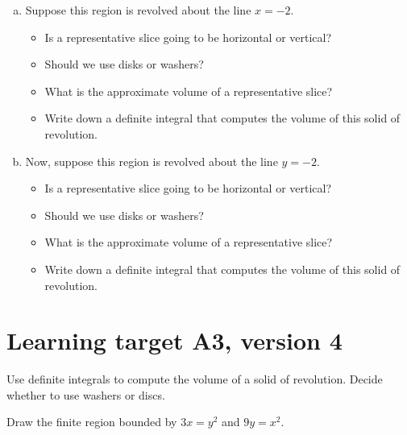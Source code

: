 \begin{enumerate}[(a), leftmargin=20pt]
	\item Suppose this region is revolved about the line $x = -2$.
	\begin{itemize}
		\item Is a representative slice going to be horizontal or vertical?
		\item Should we use disks or washers?
		\item What is the approximate volume of a representative slice?
		\item Write down a definite integral that computes the volume of this solid of revolution.
	\end{itemize}

	\vfill

	\item Now, suppose this region is revolved about the line $y=-2$.
	\begin{itemize}
		\item Is a representative slice going to be horizontal or vertical?
		\item Should we use disks or washers?
		\item What is the approximate volume of a representative slice?
		\item Write down a definite integral that computes the volume of this solid of revolution.
	\end{itemize}

	\vfill
\end{enumerate}

\pagebreak
\section{Learning target A3, version 4}

Use definite integrals to compute the volume of a solid of revolution. Decide whether to use washers or discs.

\hrulefill

Draw the finite region bounded by $3x = y^2$ and $9y=x^2$.

